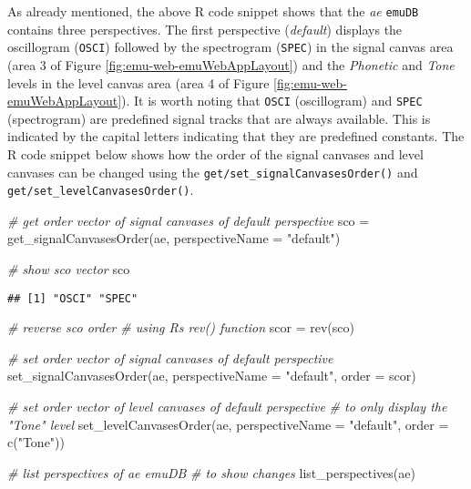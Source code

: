 \documentclass[
]{book}
\newenvironment{Shaded}{\begin{snugshade}}{\end{snugshade}}
\newcommand{\AttributeTok}[1]{\textcolor[rgb]{0.77,0.63,0.00}{#1}}
\newcommand{\CommentTok}[1]{\textcolor[rgb]{0.56,0.35,0.01}{\textit{#1}}}
\newcommand{\FunctionTok}[1]{\textcolor[rgb]{0.00,0.00,0.00}{#1}}
\newcommand{\NormalTok}[1]{#1}
\newcommand{\OtherTok}[1]{\textcolor[rgb]{0.56,0.35,0.01}{#1}}
\newcommand{\StringTok}[1]{\textcolor[rgb]{0.31,0.60,0.02}{#1}}
\begin{document}
As already mentioned, the above R code snippet shows that the \emph{ae} \texttt{emuDB} contains three perspectives. The first perspective (\emph{default}) displays the oscillogram (\texttt{OSCI}) followed by the spectrogram (\texttt{SPEC}) in the signal canvas area (area 3 of Figure \ref{fig:emu-web-emuWebAppLayout}) and the \emph{Phonetic} and \emph{Tone} levels in the level canvas area (area 4 of Figure \ref{fig:emu-web-emuWebAppLayout}). It is worth noting that \texttt{OSCI} (oscillogram) and \texttt{SPEC} (spectrogram) are predefined signal tracks that are always available. This is indicated by the capital letters indicating that they are predefined constants. The R code snippet below shows how the order of the signal canvases and level canvases can be changed using the \texttt{get/set\_signalCanvasesOrder()} and \texttt{get/set\_levelCanvasesOrder()}.

\begin{Shaded}
\begin{Highlighting}[]
\CommentTok{\# get order vector of signal canvases of default perspective}
\NormalTok{sco }\OtherTok{=} \FunctionTok{get\_signalCanvasesOrder}\NormalTok{(ae,}
                              \AttributeTok{perspectiveName =} \StringTok{"default"}\NormalTok{)}

\CommentTok{\# show sco vector}
\NormalTok{sco}
\end{Highlighting}
\end{Shaded}

\begin{verbatim}
## [1] "OSCI" "SPEC"
\end{verbatim}

\begin{Shaded}
\begin{Highlighting}[]
\CommentTok{\# reverse sco order}
\CommentTok{\# using R\textquotesingle{}s rev() function}
\NormalTok{scor }\OtherTok{=} \FunctionTok{rev}\NormalTok{(sco)}

\CommentTok{\# set order vector of signal canvases of default perspective}
\FunctionTok{set\_signalCanvasesOrder}\NormalTok{(ae,}
                        \AttributeTok{perspectiveName =} \StringTok{"default"}\NormalTok{,}
                        \AttributeTok{order =}\NormalTok{ scor)}

\CommentTok{\# set order vector of level canvases of default perspective}
\CommentTok{\# to only display the "Tone" level}
\FunctionTok{set\_levelCanvasesOrder}\NormalTok{(ae,}
                       \AttributeTok{perspectiveName =} \StringTok{"default"}\NormalTok{,}
                       \AttributeTok{order =} \FunctionTok{c}\NormalTok{(}\StringTok{"Tone"}\NormalTok{))}

\CommentTok{\# list perspectives of ae emuDB}
\CommentTok{\# to show changes}
\FunctionTok{list\_perspectives}\NormalTok{(ae)}
\end{Highlighting}
\end{Shaded}
\end{document}

